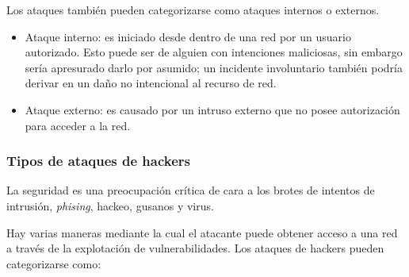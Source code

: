 \documentclass[a4paper,12pt]{report}
\begin{document}
Los ataques también pueden categorizarse como ataques internos o
externos.

\begin{itemize}
  \item Ataque interno: es iniciado desde dentro de una red
por un usuario autorizado. Esto puede ser de alguien con intenciones maliciosas,
sin embargo sería apresurado darlo por asumido; un incidente involuntario también podría derivar en un
daño no intencional al recurso de red.
  \item Ataque externo: es causado por un intruso externo que no
posee autorización para acceder a la red.
\end{itemize}

\subsubsection{Tipos de ataques de hackers}

La seguridad es una preocupación crítica de cara a los brotes de intentos de
intrusión, \emph{\mbox{phising}}, hackeo, gusanos y virus.    

Hay varias maneras mediante la cual el atacante puede obtener acceso a una red
a través de la explotación de vulnerabilidades. Los ataques de hackers
pueden categorizarse como:
\end{document}
